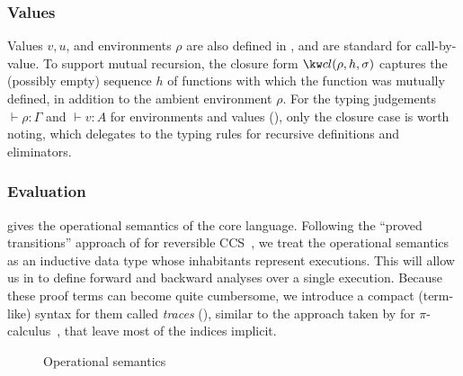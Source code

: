 \subsubsection{Values}
Values $v, u$, and environments $\rho$ are also defined in , and are standard for call-by-value. To support mutual recursion, the closure form  $\exClosure{\rho}{h}{\sigma}$ captures the (possibly empty) sequence $h$ of functions with which the function was mutually defined, in addition to the ambient environment $\rho$. For the typing judgements $\vdash \rho: \Gamma$ and $\vdash v: A$ for environments and values (), only the closure case is worth noting, which delegates to the typing rules for recursive definitions and eliminators.

\subsubsection{Evaluation}
\label{sec:core-language:eval}

 gives the operational semantics of the core language. Following the ``proved transitions'' approach of \citeauthor{boudol89} for reversible CCS~\cite{boudol89}, we treat the operational semantics as an inductive data type whose inhabitants represent executions. This will allow us in  to define forward and backward analyses over a single execution. Because these proof terms can become quite cumbersome, we introduce a compact (term-like) syntax for them called \emph{traces} (), similar to the approach taken by \citeauthor{perera16d} for $\pi$-calculus~\cite{perera16d}, that leave most of the indices implicit.

\begin{figure}
   \vspace{1mm}
   
   
   \caption{Operational semantics}
   \label{fig:core-language:semantics}
\end{figure}

